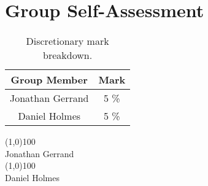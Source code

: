 \documentclass[10pt,a4paper]{report}
\author{Daniel G. Holmes}
\begin{document}
\section*{Group Self-Assessment}



\begin{table}[h]
\centering
\begin{tabular}{cc}
\hline 
Group Member & Mark \\ 
\hline
Jonathan Gerrand & 5 \% \\ 
Daniel Holmes & 5 \% \\ 
\hline 
\end{tabular} 
\caption{Discretionary mark breakdown.}
\end{table}

\noindent \line(1,0){100}  \\
Jonathan Gerrand \\ [0.75cm]

\noindent \line(1,0){100}  \\
Daniel Holmes \\ [1.0cm]
\end{document}
